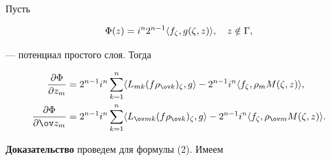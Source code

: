\begin{lem} 


Пусть 


$$ 


\Phi(z)=i^n 2^{n-1}\la f_\zeta,g(\zeta,z)\ra,\quad z\notin\Gamma, 


$$ 


--- потенциал простого слоя. Тогда 


\begin{equation} 


\begin{split} 


\frac{\partial \Phi}{\partial z_m}&=2^{n-1}i^n\sum^n_{k=1} 


\la L_{mk}(f\rho_{\ov k})_\zeta,g\ra-2^{n-1}i^n 


\la f_\zeta,\rho_{m}M(\zeta,z)\ra, \\ 


% 


\frac{\partial \Phi}{\partial \ov z_m}&=2^{n-1}i^n\sum^n_{k=1} 


\la L_{\ov mk}(f\rho_{\ov k})_\zeta,g\ra-2^{n-1}i^n 


\la f_\zeta,\rho_{\ov m}M(\zeta,z)\ra. 


\end{split} 


\end{equation} 


\end{lem} 


 


{\bf Доказательство} проведем для формулы (2). Имеем 


